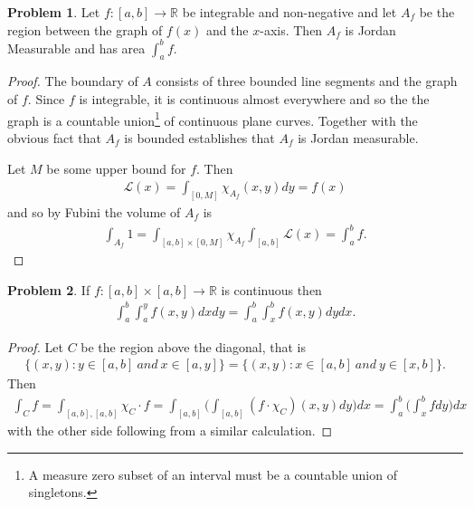 \documentclass[20pt]{article}
\theoremstyle{plain}
\theoremstyle{definition}
\newtheorem*{problem}{Problem}
\newcommand{\reals}{\mathbb{R}}
\begin{document}
\begin{problem}{3.26}
  Let $f: [a, b] \to \reals$ be integrable and non-negative and let 
  $A_f$ be the region between the graph of $f(x)$ and the $x$-axis.
  Then $A_f$ is Jordan Measurable and has area $\int_a^b f.$
\end{problem}

\begin{proof}
  The boundary of $A$ consists of three bounded line segments and the graph of $f$.
  Since $f$ is integrable, it is continuous almost everywhere and so the 
  the graph is a countable union\footnote{A measure zero subset of an interval must be a countable union of singletons.}
   of continuous plane curves.  Together with 
  the obvious fact that $A_f$ is bounded establishes that $A_f$ is 
  Jordan measurable.

  Let $M$ be some upper bound for $f$.  Then 
  \begin{align*}
    \mathcal{L}(x) = \int_{[0, M]} \chi_{A_f}(x, y)dy = f(x)
  \end{align*}
  and so by Fubini the volume of $A_f$ is 
  \begin{align*}
    \int_{A_f}1 = 
    \int_{[a, b]\times[0, M]} \chi_{A_f}
    \int_{[a, b]} \mathcal{L}(x) = 
    \int_a^b f.
  \end{align*}
\end{proof}



\begin{problem}{3.27}
  If $f: [a, b] \times [a, b] \to \reals$ is continuous then 
  \begin{align*}
    \int_a^b \int_a^y f(x, y)dxdy = \int_a^b \int_x^b f(x, y)dy  dx.
  \end{align*}
\end{problem}

\begin{proof}
  Let $C$ be the region above the diagonal, that is 
  \begin{align*}
    \{ (x, y) : y \in [a, b]\ and \ x \in [a, y] \} = 
    \{ (x, y) : x \in [a, b]\ and \ y \in [x, b] \}.
  \end{align*}
  Then 
  \begin{align*}
    \int_C f = 
    \int_{[a, b], [a, b]}\chi_C \cdot f = 
    \int_{[a, b]}\bigg(\int_{[a, b]}(f\cdot \chi_C)(x, y)dy\bigg)dx = 
    \int_a^b \bigg(\int_x^b f dy\bigg)dx
  \end{align*}
  with the other side following from a similar calculation.
\end{proof}
\end{document}

